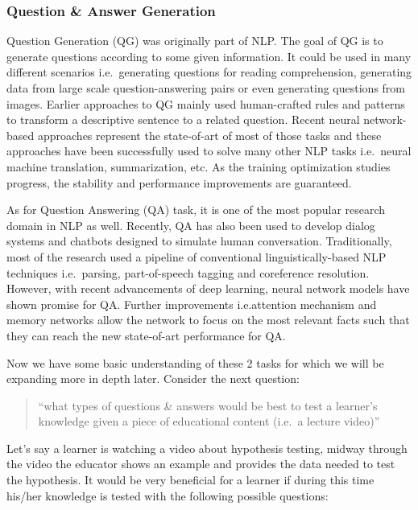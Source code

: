 \documentclass{acm_proc_article-sp}
\begin{document}
\subsubsection{Question \& Answer
Generation}\label{question-answer-generation}

Question Generation (QG) was originally part of NLP. The goal of QG is
to generate questions according to some given information. It could be
used in many different scenarios i.e.~generating questions for reading
comprehension, generating data from large scale question-answering pairs
or even generating questions from images. Earlier approaches to QG
mainly used human-crafted rules and patterns to transform a descriptive
sentence to a related question. Recent neural network-based approaches
represent the state-of-art of most of those tasks and these approaches
have been successfully used to solve many other NLP tasks i.e.~neural
machine translation, summarization, etc. As the training optimization
studies progress, the stability and performance improvements are
guaranteed.

As for Question Answering (QA) task, it is one of the most popular
research domain in NLP as well. Recently, QA has also been used to
develop dialog systems and chatbots designed to simulate human
conversation. Traditionally, most of the research used a pipeline of
conventional linguistically-based NLP techniques i.e.~parsing,
part-of-speech tagging and coreference resolution. However, with recent
advancements of deep learning, neural network models have shown promise
for QA. Further improvements i.e.attention mechanism and memory networks
allow the network to focus on the most relevant facts such that they can
reach the new state-of-art performance for QA.

Now we have some basic understanding of these 2 tasks for which we will
be expanding more in depth later. Consider the next question:

\begin{quote}
``what types of questions \& answers would be best to test a learner's
knowledge given a piece of educational content (i.e.~a lecture video)''
\end{quote}

Let's say a learner is watching a video about hypothesis testing, midway
through the video the educator shows an example and provides the data
needed to test the hypothesis. It would be very beneficial for a learner
if during this time his/her knowledge is tested with the following
possible questions:
\end{document}
